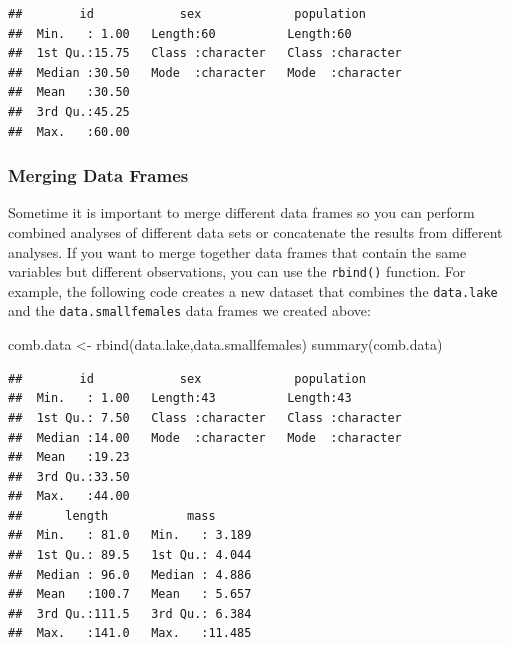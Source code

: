 \documentclass[
]{book}
\newenvironment{Shaded}{\begin{snugshade}}{\end{snugshade}}
\newcommand{\FunctionTok}[1]{\textcolor[rgb]{0.00,0.00,0.00}{#1}}
\newcommand{\NormalTok}[1]{#1}
\newcommand{\OtherTok}[1]{\textcolor[rgb]{0.56,0.35,0.01}{#1}}
\begin{document}
\begin{verbatim}
##        id            sex             population       
##  Min.   : 1.00   Length:60          Length:60         
##  1st Qu.:15.75   Class :character   Class :character  
##  Median :30.50   Mode  :character   Mode  :character  
##  Mean   :30.50                                        
##  3rd Qu.:45.25                                        
##  Max.   :60.00
\end{verbatim}

\hypertarget{merging-data-frames}{%
\subsubsection*{Merging Data Frames}\label{merging-data-frames}}

Sometime it is important to merge different data frames so you can perform combined analyses of different data sets or concatenate the results from different analyses. If you want to merge together data frames that contain the same variables but different observations, you can use the \texttt{rbind()} function. For example, the following code creates a new dataset that combines the \texttt{data.lake} and the \texttt{data.smallfemales} data frames we created above:

\begin{Shaded}
\begin{Highlighting}[]
\NormalTok{comb.data }\OtherTok{\textless{}{-}} \FunctionTok{rbind}\NormalTok{(data.lake,data.smallfemales)}
\FunctionTok{summary}\NormalTok{(comb.data)}
\end{Highlighting}
\end{Shaded}

\begin{verbatim}
##        id            sex             population       
##  Min.   : 1.00   Length:43          Length:43         
##  1st Qu.: 7.50   Class :character   Class :character  
##  Median :14.00   Mode  :character   Mode  :character  
##  Mean   :19.23                                        
##  3rd Qu.:33.50                                        
##  Max.   :44.00                                        
##      length           mass       
##  Min.   : 81.0   Min.   : 3.189  
##  1st Qu.: 89.5   1st Qu.: 4.044  
##  Median : 96.0   Median : 4.886  
##  Mean   :100.7   Mean   : 5.657  
##  3rd Qu.:111.5   3rd Qu.: 6.384  
##  Max.   :141.0   Max.   :11.485
\end{verbatim}
\end{document}
